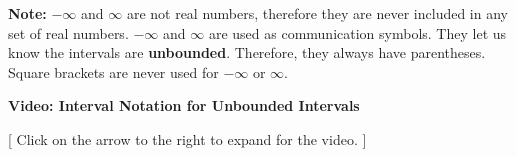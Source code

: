 \documentclass{ximera}
\begin{document}
\begin{itemize}
\begin{itemize}
\begin{image}
	\end{image}

	\end{itemize}

\end{itemize}



\textbf{Note:} $-\infty$ and $\infty$ are not real numbers, therefore they are never included in any set of real numbers.  $-\infty$ and $\infty$ are used as communication symbols. They let us know the intervals are \textbf{unbounded}. Therefore, they always have parentheses.  Square brackets are never used for $-\infty$ or $\infty$.










\begin{onlineOnly}
\begin{explanation} \textbf{\textcolor{red!75!green}{Video: Interval Notation for Unbounded Intervals}} 

[ Click on the arrow to the right to expand for the video. ]
\begin{expandable} 

\begin{center}
\end{center}

\end{expandable}

\end{explanation}
\end{onlineOnly}
\end{document}
